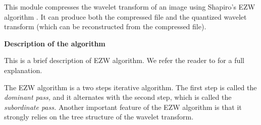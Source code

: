 This module compresses the wavelet transform of an image using 
Shapiro's EZW algorithm \cite{kn:shp}. It can produce both 
the compressed file and the quantized wavelet transform 
(which can be reconstructed from the compressed file). 
\newline 

{\bf Description of the algorithm} 
\newline

This is a brief description of EZW algorithm. We refer the reader 
to \cite{kn:shp} for a full explanation. 

The EZW algorithm is a two steps iterative algorithm. The first step 
is called the {\em dominant pass,} and it alternates with the second step, 
which is called the {\em subordinate pass.} Another important feature of 
the EZW algorithm is that it strongly relies on the tree structure 
of the wavelet transform. 

